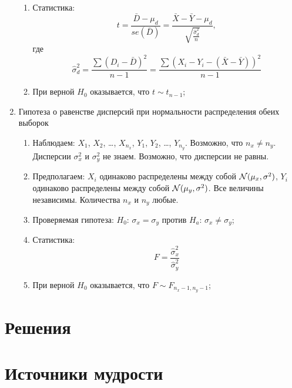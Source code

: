 \documentclass[12pt, a4paper]{article}
\newcounter{problem}[section]
\begin{document}
\begin{enumerate}[resume]
\begin{enumerate}
     \item Статистика:
	\[
	  t = \frac{\bar D - \mu_d}{se(\bar D)} =
	  \frac{\bar X - \bar Y - \mu_d}{\sqrt{\frac{\hat \sigma^2_d}{n}}},
      \]
      где
      \[
	\hat \sigma^2_d = \frac{\sum (D_i - \bar D)^2 }{n - 1} = \frac{\sum (X_i - Y_i - (\bar X - \bar Y))^2 }{n - 1}
      \]

    \item При верной $H_0$ оказывается, что $t \sim t_{n-1}$;
\end{enumerate}


  \item Гипотеза о равенстве дисперсий при нормальности распределения обеих выборок
    \begin{enumerate}
      \item Наблюдаем: $X_1$, $X_2$, \ldots, $X_{n_x}$, $Y_1$, $Y_2$, \ldots, $Y_{n_y}$.
	Возможно, что $n_x \neq n_y$. Дисперсии $\sigma^2_x$ и $\sigma^2_y$ не знаем. Возможно, что дисперсии не равны.
      \item Предполагаем: $X_i$ одинаково распределены между собой $\mathcal{N}(\mu_x, \sigma^2)$,
	$Y_i$ одинаково распределены между собой $\mathcal{N}(\mu_y, \sigma^2)$.
	Все величины независимы. Количества $n_x$ и $n_y$ любые.


      \item Проверяемая гипотеза: $H_0$: $\sigma_x = \sigma_y$ против $H_a$: $\sigma_x \neq \sigma_y$;

     \item Статистика:
	\[
	F = \frac{\hat \sigma^2_x}{\hat \sigma^2_y}
      \]
     \item При верной $H_0$ оказывается, что $F \sim F_{n_x-1, n_y - 1}$;
\end{enumerate}


\end{enumerate}








\renewenvironment{solution}[1]{%
         \vskip .5cm plus 2cm minus 0.1cm%
         {\bfseries \hyperlink{problem:#1}{#1.}}%
}%
{%
}%

\section{Решения}



\printindex


\section{Источники мудрости}

\nocite{buzun2015stochastic}

\printbibliography[heading=none]
\end{document}

